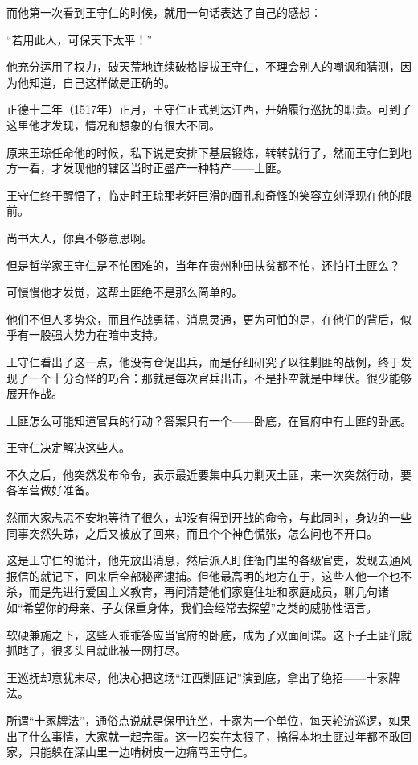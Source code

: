 \begin{multicols}{\theparacolNo}
而他第一次看到王守仁的时候，就用一句话表达了自己的感想：

“若用此人，可保天下太平！”

他充分运用了权力，破天荒地连续破格提拔王守仁，不理会别人的嘲讽和猜测，因为他知道，自己这样做是正确的。

正德十二年（1517年）正月，王守仁正式到达江西，开始履行巡抚的职责。可到了这里他才发现，情况和想象的有很大不同。

原来王琼任命他的时候，私下说是安排下基层锻炼，转转就行了，然而王守仁到地方一看，才发现他的辖区当时正盛产一种特产——土匪。

王守仁终于醒悟了，临走时王琼那老奸巨滑的面孔和奇怪的笑容立刻浮现在他的眼前。

尚书大人，你真不够意思啊。

但是哲学家王守仁是不怕困难的，当年在贵州种田扶贫都不怕，还怕打土匪么？

可慢慢他才发觉，这帮土匪绝不是那么简单的。

他们不但人多势众，而且作战勇猛，消息灵通，更为可怕的是，在他们的背后，似乎有一股强大势力在暗中支持。

王守仁看出了这一点，他没有仓促出兵，而是仔细研究了以往剿匪的战例，终于发现了一个十分奇怪的巧合：那就是每次官兵出击，不是扑空就是中埋伏。很少能够展开作战。

土匪怎么可能知道官兵的行动？答案只有一个——卧底，在官府中有土匪的卧底。

王守仁决定解决这些人。

不久之后，他突然发布命令，表示最近要集中兵力剿灭土匪，来一次突然行动，要各军营做好准备。

然而大家忐忑不安地等待了很久，却没有得到开战的命令，与此同时，身边的一些同事突然失踪，之后又被放了回来，而且个个神色慌张，怎么问也不开口。

这是王守仁的诡计，他先放出消息，然后派人盯住衙门里的各级官吏，发现去通风报信的就记下，回来后全部秘密逮捕。但他最高明的地方在于，这些人他一个也不杀，而是先进行爱国主义教育，再问清楚他们家庭住址和家庭成员，聊几句诸如“希望你的母亲、子女保重身体，我们会经常去探望”之类的威胁性语言。

软硬兼施之下，这些人乖乖答应当官府的卧底，成为了双面间谍。这下子土匪们就抓瞎了，很多头目就此被一网打尽。

王巡抚却意犹未尽，他决心把这场“江西剿匪记”演到底，拿出了绝招——十家牌法。

所谓“十家牌法”，通俗点说就是保甲连坐，十家为一个单位，每天轮流巡逻，如果出了什么事情，大家就一起完蛋。这一招实在太狠了，搞得本地土匪过年都不敢回家，只能躲在深山里一边啃树皮一边痛骂王守仁。


\end{multicols}
